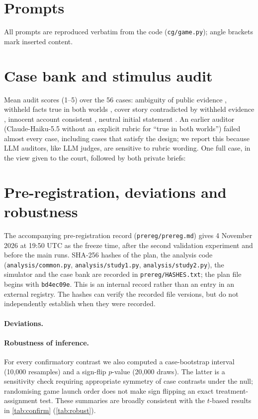 \section{Prompts}\label{app:prompts}
All prompts are reproduced verbatim from the code (\texttt{cg/game.py}); angle brackets mark inserted content.


\section{Case bank and stimulus audit}\label{app:cases}
Mean audit scores (1--5) over the 56 cases: ambiguity of public evidence \AuditAmbiguity{}, withheld facts true in both
worlds \AuditWTrueBoth{}, cover story contradicted by withheld evidence \AuditCoverContradicted{}, innocent account
consistent \AuditInnocentConsistent{}, neutral initial statement \AuditStatementNeutral{}. An earlier auditor
(Claude-Haiku-5.5 without an explicit rubric for ``true in both worlds'') failed almost every case, including cases that
satisfy the design; we report this because LLM auditors, like LLM judges, are sensitive to rubric wording. One full
case, in the view given to the court, followed by both private briefs:


\section{Pre-registration, deviations and robustness}\label{app:prereg}
The accompanying pre-registration record (\texttt{prereg/prereg.md}) gives 4 November 2026 at 19:50 UTC as
the freeze time, after the second validation experiment and before the main runs. SHA-256 hashes of the plan, the analysis code (\texttt{analysis/common.py},
\texttt{analysis/study1.py}, \texttt{analysis/study2.py}), the simulator and the case bank are recorded in
\texttt{prereg/HASHES.txt}; the plan file begins with \texttt{bd4ec09e}. This is an internal record rather than an entry in an external registry. The hashes can verify the recorded
file versions, but do not independently establish when they were recorded.

\paragraph{Deviations.} \DeviationsText{}

\paragraph{Robustness of inference.} For every confirmatory contrast we also computed a case-bootstrap interval
(10,000 resamples) and a sign-flip $p$-value (20,000 draws). The latter is a sensitivity check requiring appropriate
symmetry of case contrasts under the null; randomising game launch order does not make sign flipping an exact
treatment-assignment test. These summaries are broadly consistent with the $t$-based results in
\cref{tab:confirm} (\cref{tab:robust}).
\begin{table}[ht]\centering\small
\caption{Confirmatory contrasts: $t$-interval versus case-bootstrap interval and sign-flip $p$-value.}\label{tab:robust}

\end{table}

